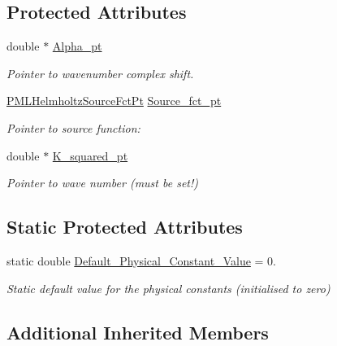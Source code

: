 \subsection*{Protected Attributes}
\begin{DoxyCompactItemize}
\item 
double $\ast$ \hyperlink{classoomph_1_1PMLHelmholtzEquationsBase_a8edfd5d6b057ee97e9b95001c59dfa78}{Alpha\+\_\+pt}
\begin{DoxyCompactList}\small\item\em Pointer to wavenumber complex shift. \end{DoxyCompactList}\item 
\hyperlink{classoomph_1_1PMLHelmholtzEquationsBase_abf57477abc2672cd680742e17721a07f}{P\+M\+L\+Helmholtz\+Source\+Fct\+Pt} \hyperlink{classoomph_1_1PMLHelmholtzEquationsBase_aba2080d52978ab390f035f0ee858c0d6}{Source\+\_\+fct\+\_\+pt}
\begin{DoxyCompactList}\small\item\em Pointer to source function\+: \end{DoxyCompactList}\item 
double $\ast$ \hyperlink{classoomph_1_1PMLHelmholtzEquationsBase_aa214aa3a9117426abdceab9364c558b7}{K\+\_\+squared\+\_\+pt}
\begin{DoxyCompactList}\small\item\em Pointer to wave number (must be set!) \end{DoxyCompactList}\end{DoxyCompactItemize}
\subsection*{Static Protected Attributes}
\begin{DoxyCompactItemize}
\item 
static double \hyperlink{classoomph_1_1PMLHelmholtzEquationsBase_a2a970f3f95953bd1c7978733201437a8}{Default\+\_\+\+Physical\+\_\+\+Constant\+\_\+\+Value} = 0.
\begin{DoxyCompactList}\small\item\em Static default value for the physical constants (initialised to zero) \end{DoxyCompactList}\end{DoxyCompactItemize}
\subsection*{Additional Inherited Members}


